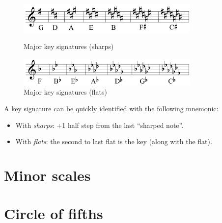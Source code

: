 \begin{figure}[h]
    \begin{center}
        \includegraphics[width=0.8\textwidth]{img/majorsharp}
        \caption{Major key signatures (sharps)}
        \includegraphics[width=0.8\textwidth]{img/majorflat}
        \caption{Major key signatures (flats)}
    \end{center}
\end{figure}
A key signature can be quickly identified with the following mnemonic:
\begin{itemize}
    \item With \emph{sharps}: +1 half step from the last ``sharped note''.
    \item With \emph{flats}: the second to last flat is the key (along with the flat).
\end{itemize}

\section{Minor scales}
\section{Circle of fifths}